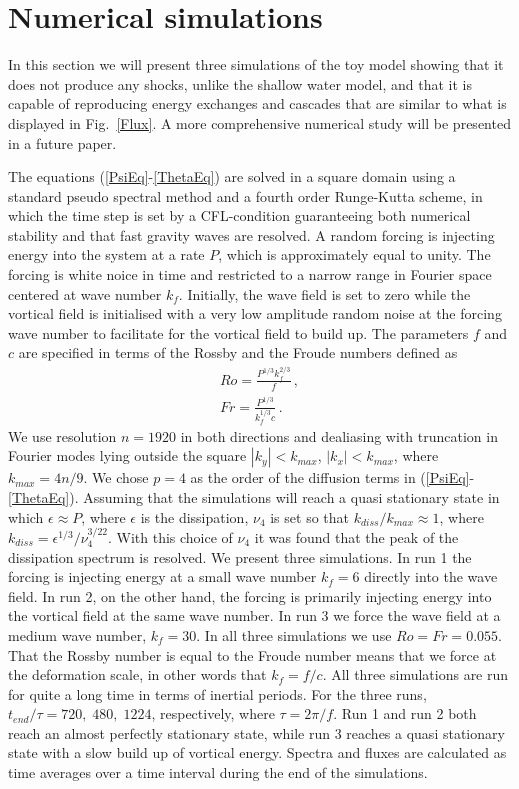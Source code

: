 \section{Numerical simulations}
In this section we will present { three}  simulations of the toy model showing that it does not produce any shocks, unlike the shallow water model, and that it is capable of reproducing energy exchanges and cascades that are similar to what is displayed in Fig.~\ref{Flux}.  A more comprehensive numerical study will be presented in a future paper.

The equations (\ref{PsiEq}-\ref{ThetaEq}) are solved in a square domain  using a standard pseudo spectral method and a fourth order Runge-Kutta scheme, in which the time step is set by a CFL-condition guaranteeing both numerical stability and that fast gravity waves are resolved.   A random forcing is  injecting energy into the system at a rate $ P $, which is approximately equal to unity.
The forcing is white noice in time and restricted to a narrow range in Fourier space centered at wave number $ k_f $. Initially, the wave field is set to zero while the vortical field is initialised with a very low amplitude random noise at the forcing wave number to facilitate for the vortical field to build up.
The parameters $ f $ and $ c $ are specified in terms of the Rossby and the Froude numbers defined as
\begin{eqnarray}
Ro = \frac{P^{1/3} k_f^{2/3}}{f} \, , \\
Fr = \frac{P^{1/3}}{k_f^{1/3} c}  \, .
\end{eqnarray}
We use resolution $ n = 1920 $ in both directions and dealiasing with truncation in Fourier modes  lying outside the square $ | k_y | <  k_{max} $,  $ | k_x | < k_{max} $,  where $ k_{max} = 4n/9 $.
We chose  $ p = 4 $ as the order of the diffusion terms in (\ref{PsiEq}-\ref{ThetaEq}).  { Assuming that the simulations will reach a quasi stationary state in which $ \epsilon \approx P $, where $ \epsilon $ is the dissipation, $ \nu_4 $  is set so that $ k_{diss}/k_{max} \approx 1$, where $ k_{diss} = \epsilon^{1/3}/\nu_4^{3/22} $. With this choice of $ \nu_4 $ it was found that the peak of the dissipation spectrum is resolved. We present three simulations. In run 1 the forcing is injecting energy at a small wave number $ k_f = 6 $ directly into the wave field. In run 2, on the other hand, the forcing is primarily injecting energy into the vortical field at the same wave number. In run 3 we force the wave field at a medium wave number, $ k_f = 30 $.
In all three simulations we use $ Ro= Fr = 0.055 $. } That
the Rossby number is equal to the Froude number means that we force at the deformation scale,  in other words that  $ k_f  = f/c $.  { All  three simulations are run for quite a long time in terms of inertial periods.
For the three runs, $ t_{end}/\tau = 720, \; 480, \;  1224 $, respectively,  where $ \tau = 2 \pi /f  $. Run 1 and run 2 both reach an almost perfectly stationary state, while run 3 reaches a quasi stationary state with a slow build up of vortical energy. Spectra and fluxes are calculated as time averages over a time interval during the end of the simulations. }





